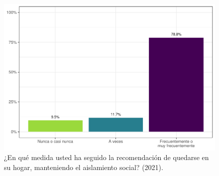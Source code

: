 \documentclass[
  12pt,
]{book}
\begin{document}
\begin{figure}

{\centering \includegraphics{reporte-elsoc_files/figure-latex/dist-total-1} 

}

\caption{¿En qué medida usted ha seguido la recomendación de quedarse en su hogar, manteniendo el aislamiento social? (2021).}\label{fig:dist-total}
\end{figure}
\end{document}
